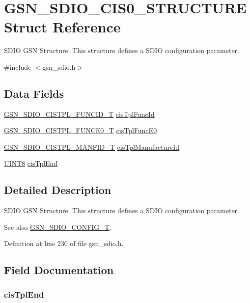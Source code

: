\hypertarget{a00217}{
\section{GSN\_\-SDIO\_\-CIS0\_\-STRUCTURE Struct Reference}
\label{a00217}
}


SDIO GSN Structure. This structure defines a SDIO configuration parameter.  




{\ttfamily \#include $<$gsn\_\-sdio.h$>$}

\subsection*{Data Fields}
\begin{DoxyCompactItemize}
\item 
\hyperlink{a00221}{GSN\_\-SDIO\_\-CISTPL\_\-FUNCID\_\-T} \hyperlink{a00217_a0ab47728bbe9b5f06828d5c1d110fb15}{cisTplFuncId}
\item 
\hyperlink{a00219}{GSN\_\-SDIO\_\-CISTPL\_\-FUNCE0\_\-T} \hyperlink{a00217_ada7ed5572c3685d8476a9feff469f20b}{cisTplFuncE0}
\item 
\hyperlink{a00222}{GSN\_\-SDIO\_\-CISTPL\_\-MANFID\_\-T} \hyperlink{a00217_a0ad9c3073be966de94fe1c051b005492}{cisTplManufactureId}
\item 
\hyperlink{a00660_gab27e9918b538ce9d8ca692479b375b6a}{UINT8} \hyperlink{a00217_aa6758ae248de0b57e82ba9ce0f02631e}{cisTplEnd}
\end{DoxyCompactItemize}


\subsection{Detailed Description}
SDIO GSN Structure. This structure defines a SDIO configuration parameter. 

\begin{DoxySeeAlso}{See also}
\hyperlink{a00653_ga741fda4dc2cd93143a8a73ddaace7de8}{GSN\_\-SDIO\_\-CONFIG\_\-T}. 
\end{DoxySeeAlso}


Definition at line 230 of file gsn\_\-sdio.h.



\subsection{Field Documentation}
\hypertarget{a00217_aa6758ae248de0b57e82ba9ce0f02631e}{
\subsubsection[{cisTplEnd}]{ {\bf cisTplEnd}}}
\label{a00217_aa6758ae248de0b57e82ba9ce0f02631e}


